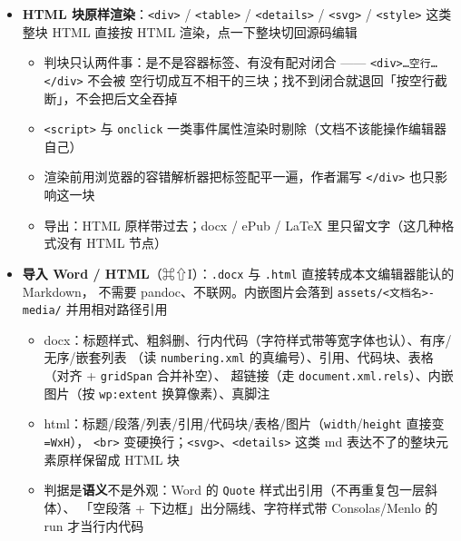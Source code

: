 \documentclass[11pt,a4paper]{ctexart}
\begin{document}
\begin{itemize}
\texttt{=x200} 只定高（宽按比例）；路径含空格用尖括号 \texttt{\textless{}my pic.png\textgreater{}} 包起来；
\texttt{=WxH} 可以和 \texttt{"title"} 共存。渲染、docx（EMU 换算）、ePub（\texttt{width}/\texttt{height}
属性）、LaTeX（像素 × 0.75 → pt）四处同一套换算，宽度仍受版心封顶
\item \textbf{HTML 块原样渲染}：\texttt{\textless{}div\textgreater{}} / \texttt{\textless{}table\textgreater{}} / \texttt{\textless{}details\textgreater{}} / \texttt{\textless{}svg\textgreater{}} / \texttt{\textless{}style\textgreater{}} 这类整块
HTML 直接按 HTML 渲染，点一下整块切回源码编辑
\begin{itemize}
\item 判块只认两件事：是不是容器标签、有没有配对闭合 —— \texttt{\textless{}div\textgreater{}…空行…\textless{}/div\textgreater{}} 不会被
空行切成互不相干的三块；找不到闭合就退回「按空行截断」，不会把后文全吞掉
\item \texttt{\textless{}script\textgreater{}} 与 \texttt{onclick} 一类事件属性渲染时剔除（文档不该能操作编辑器自己）
\item 渲染前用浏览器的容错解析器把标签配平一遍，作者漏写 \texttt{\textless{}/div\textgreater{}} 也只影响这一块
\item 导出：HTML 原样带过去；docx / ePub / LaTeX 里只留文字（这几种格式没有 HTML 节点）
\end{itemize}
\item \textbf{导入 Word / HTML}（⌘⇧I）：\texttt{.docx} 与 \texttt{.html} 直接转成本文编辑器能认的 Markdown，
不需要 pandoc、不联网。内嵌图片会落到 \texttt{assets/\textless{}文档名\textgreater{}-media/} 并用相对路径引用
\begin{itemize}
\item docx：标题样式、粗斜删、行内代码（字符样式带等宽字体也认）、有序/无序/嵌套列表
（读 \texttt{numbering.xml} 的真编号）、引用、代码块、表格（对齐 + \texttt{gridSpan} 合并补空）、
超链接（走 \texttt{document.xml.rels}）、内嵌图片（按 \texttt{wp:extent} 换算像素）、真脚注
\item html：标题/段落/列表/引用/代码块/表格/图片（\texttt{width}/\texttt{height} 直接变 \texttt{=WxH}），
\texttt{\textless{}br\textgreater{}} 变硬换行；\texttt{\textless{}svg\textgreater{}}、\texttt{\textless{}details\textgreater{}} 这类 md 表达不了的整块元素原样保留成 HTML 块
\item 判据是\textbf{语义}不是外观：Word 的 \texttt{Quote} 样式出引用（不再重复包一层斜体）、
「空段落 + 下边框」出分隔线、字符样式带 Consolas/Menlo 的 run 才当行内代码
\end{itemize}

\end{itemize}
\end{document}
